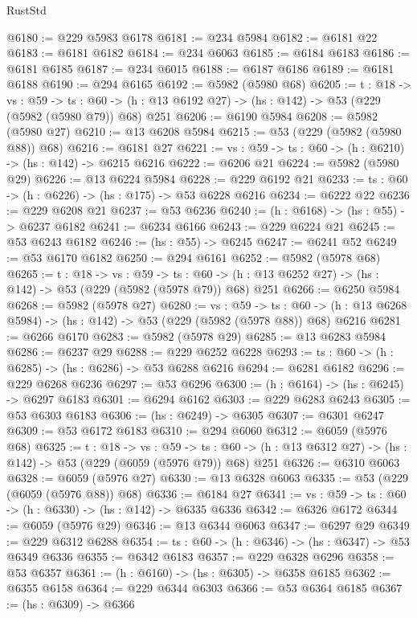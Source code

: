 \begin{lexlean}{RustStd}
\begin{coremodule}
@6180 := @229 @5983 @6178
@6181 := @234 @5984
@6182 := @6181 @22
@6183 := @6181 @6182
@6184 := @234 @6063
@6185 := @6184 @6183
@6186 := @6181 @6185
@6187 := @234 @6015
@6188 := @6187 @6186
@6189 := @6181 @6188
@6190 := @294 @6165
@6192 := @5982 (@5980 @68)
@6205 := {t : @18} ->
  {vs : @59} ->
  {ts : @60} -> (h : @13 @6192 @27) -> (hs : @142) -> @53 (@229 (@5982 (@5980 @79)) @68) @251
@6206 := @6190 @5984
@6208 := @5982 (@5980 @27)
@6210 := @13 @6208 @5984
@6215 := @53 (@229 (@5982 (@5980 @88)) @68)
@6216 := @6181 @27
@6221 := {vs : @59} -> {ts : @60} -> (h : @6210) -> (hs : @142) -> @6215 @6216
@6222 := @6206 @21
@6224 := @5982 (@5980 @29)
@6226 := @13 @6224 @5984
@6228 := @229 @6192 @21
@6233 := {ts : @60} -> (h : @6226) -> (hs : @175) -> @53 @6228 @6216
@6234 := @6222 @22
@6236 := @229 @6208 @21
@6237 := @53 @6236
@6240 := (h : @6168) -> (hs : @55) -> @6237 @6182
@6241 := @6234 @6166
@6243 := @229 @6224 @21
@6245 := @53 @6243 @6182
@6246 := (hs : @55) -> @6245
@6247 := @6241 @52
@6249 := @53 @6170 @6182
@6250 := @294 @6161
@6252 := @5982 (@5978 @68)
@6265 := {t : @18} ->
  {vs : @59} ->
  {ts : @60} -> (h : @13 @6252 @27) -> (hs : @142) -> @53 (@229 (@5982 (@5978 @79)) @68) @251
@6266 := @6250 @5984
@6268 := @5982 (@5978 @27)
@6280 := {vs : @59} ->
  {ts : @60} -> (h : @13 @6268 @5984) -> (hs : @142) -> @53 (@229 (@5982 (@5978 @88)) @68) @6216
@6281 := @6266 @6170
@6283 := @5982 (@5978 @29)
@6285 := @13 @6283 @5984
@6286 := @6237 @29
@6288 := @229 @6252 @6228
@6293 := {ts : @60} -> (h : @6285) -> (hs : @6286) -> @53 @6288 @6216
@6294 := @6281 @6182
@6296 := @229 @6268 @6236
@6297 := @53 @6296
@6300 := (h : @6164) -> (hs : @6245) -> @6297 @6183
@6301 := @6294 @6162
@6303 := @229 @6283 @6243
@6305 := @53 @6303 @6183
@6306 := (hs : @6249) -> @6305
@6307 := @6301 @6247
@6309 := @53 @6172 @6183
@6310 := @294 @6060
@6312 := @6059 (@5976 @68)
@6325 := {t : @18} ->
  {vs : @59} ->
  {ts : @60} -> (h : @13 @6312 @27) -> (hs : @142) -> @53 (@229 (@6059 (@5976 @79)) @68) @251
@6326 := @6310 @6063
@6328 := @6059 (@5976 @27)
@6330 := @13 @6328 @6063
@6335 := @53 (@229 (@6059 (@5976 @88)) @68)
@6336 := @6184 @27
@6341 := {vs : @59} -> {ts : @60} -> (h : @6330) -> (hs : @142) -> @6335 @6336
@6342 := @6326 @6172
@6344 := @6059 (@5976 @29)
@6346 := @13 @6344 @6063
@6347 := @6297 @29
@6349 := @229 @6312 @6288
@6354 := {ts : @60} -> (h : @6346) -> (hs : @6347) -> @53 @6349 @6336
@6355 := @6342 @6183
@6357 := @229 @6328 @6296
@6358 := @53 @6357
@6361 := (h : @6160) -> (hs : @6305) -> @6358 @6185
@6362 := @6355 @6158
@6364 := @229 @6344 @6303
@6366 := @53 @6364 @6185
@6367 := (hs : @6309) -> @6366

\end{coremodule}
\end{lexlean}

